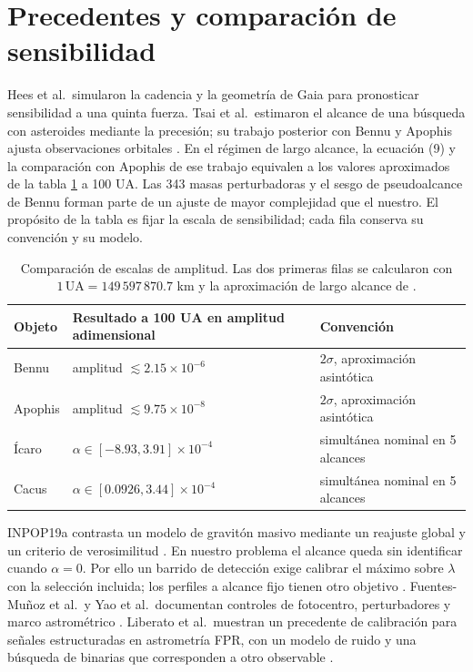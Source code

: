 \documentclass[11pt,a4paper]{article}
\begin{document}
\section{Precedentes y comparación de sensibilidad}
Hees et al.\ simularon la cadencia y la geometría de Gaia para pronosticar sensibilidad a una quinta fuerza. Tsai et al.\ estimaron el alcance de una búsqueda con asteroides mediante la precesión; su trabajo posterior con Bennu y Apophis ajusta observaciones orbitales \cite{hees,tsaiforecast,bennu}. En el régimen de largo alcance, la ecuación (9) y la comparación con Apophis de ese trabajo equivalen a los valores aproximados de la tabla \ref{tab:benchmark} a 100 UA. Las 343 masas perturbadoras y el sesgo de pseudoalcance de Bennu forman parte de un ajuste de mayor complejidad que el nuestro. El propósito de la tabla es fijar la escala de sensibilidad; cada fila conserva su convención y su modelo.

\begin{table}[htbp]
\centering
\small
\begin{tabular}{lll}
\toprule
Objeto & Resultado a 100 UA en amplitud adimensional & Convención \\
\midrule
Bennu & amplitud $\lesssim 2.15\times10^{-6}$ & $2\sigma$, aproximación asintótica \\
Apophis & amplitud $\lesssim 9.75\times10^{-8}$ & $2\sigma$, aproximación asintótica \\
Ícaro & $\alpha\in[-8.93,3.91]\times10^{-4}$ & simultánea nominal en 5 alcances \\
Cacus & $\alpha\in[0.0926,3.44]\times10^{-4}$ & simultánea nominal en 5 alcances \\
\bottomrule
\end{tabular}
\caption{Comparación de escalas de amplitud. Las dos primeras filas se calcularon con $1\,\mathrm{UA}=149\,597\,870.7$ km y la aproximación de largo alcance de \cite{bennu}.}
\label{tab:benchmark}
\end{table}

INPOP19a contrasta un modelo de gravitón masivo mediante un reajuste global y un criterio de verosimilitud \cite{inpop19a}. En nuestro problema el alcance queda sin identificar cuando $\alpha=0$. Por ello un barrido de detección exige calibrar el máximo sobre $\lambda$ con la selección incluida; los perfiles a alcance fijo tienen otro objetivo \cite{davies}. Fuentes-Muñoz et al.\ y Yao et al.\ documentan controles de fotocentro, perturbadores y marco astrométrico \cite{fuentes,yao}. Liberato et al.\ muestran un precedente de calibración para señales estructuradas en astrometría FPR, con un modelo de ruido y una búsqueda de binarias que corresponden a otro observable \cite{liberato}.
\end{document}
